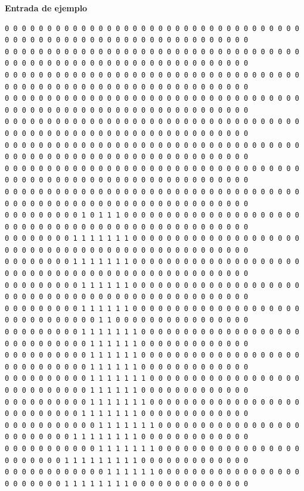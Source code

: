 \documentclass{oci}
\begin{document}
\newpage
\begin{sampleDescription}
{\bf Entrada de ejemplo}
{\tiny
\begin{verbatim}
0 0 0 0 0 0 0 0 0 0 0 0 0 0 0 0 0 0 0 0 0 0 0 0 0 0 0 0 0 0 0 0 0 0 0 0 0 0 0 0 0 0 0 0 0 0 0 0 0 0 0 0 0 0 0 0 0 0 0 0 0 0 0 0
0 0 0 0 0 0 0 0 0 0 0 0 0 0 0 0 0 0 0 0 0 0 0 0 0 0 0 0 0 0 0 0 0 0 0 0 0 0 0 0 0 0 0 0 0 0 0 0 0 0 0 0 0 0 0 0 0 0 0 0 0 0 0 0
0 0 0 0 0 0 0 0 0 0 0 0 0 0 0 0 0 0 0 0 0 0 0 0 0 0 0 0 0 0 0 0 0 0 0 0 0 0 0 0 0 0 0 0 0 0 0 0 0 0 0 0 0 0 0 0 0 0 0 0 0 0 0 0
0 0 0 0 0 0 0 0 0 0 0 0 0 0 0 0 0 0 0 0 0 0 0 0 0 0 0 0 0 0 0 0 0 0 0 0 0 0 0 0 0 0 0 0 0 0 0 0 0 0 0 0 0 0 0 0 0 0 0 0 0 0 0 0
0 0 0 0 0 0 0 0 0 0 0 0 0 0 0 0 0 0 0 0 0 0 0 0 0 0 0 0 0 0 0 0 0 0 0 0 0 0 0 0 0 0 0 0 0 0 0 0 0 0 0 0 0 0 0 0 0 0 0 0 0 0 0 0
0 0 0 0 0 0 0 0 0 0 0 0 0 0 0 0 0 0 0 0 0 0 0 0 0 0 0 0 0 0 0 0 0 0 0 0 0 0 0 0 0 0 0 0 0 0 0 0 0 0 0 0 0 0 0 0 0 0 0 0 0 0 0 0
0 0 0 0 0 0 0 0 0 0 0 0 0 0 0 0 0 0 0 0 0 0 0 0 0 0 0 0 0 0 0 0 0 0 0 0 0 0 0 0 0 0 0 0 0 0 0 0 0 0 0 0 0 0 0 0 0 0 0 0 0 0 0 0
0 0 0 0 0 0 0 0 0 0 0 0 0 0 0 0 0 0 0 0 0 0 0 0 0 0 0 0 0 0 0 0 0 0 0 0 0 0 0 0 0 0 0 0 0 0 0 0 0 0 0 0 0 0 0 0 0 0 0 0 0 0 0 0
0 0 0 0 0 0 0 0 0 1 0 1 1 1 0 0 0 0 0 0 0 0 0 0 0 0 0 0 0 0 0 0 0 0 0 0 0 0 0 0 0 0 0 0 0 0 0 0 0 0 0 0 0 0 0 0 0 0 0 0 0 0 0 0
0 0 0 0 0 0 0 0 1 1 1 1 1 1 1 0 0 0 0 0 0 0 0 0 0 0 0 0 0 0 0 0 0 0 0 0 0 0 0 0 0 0 0 0 0 0 0 0 0 0 0 0 0 0 0 0 0 0 0 0 0 0 0 0
0 0 0 0 0 0 0 0 1 1 1 1 1 1 1 0 0 0 0 0 0 0 0 0 0 0 0 0 0 0 0 0 0 0 0 0 0 0 0 0 0 0 0 0 0 0 0 0 0 0 0 0 0 0 0 0 0 0 0 0 0 0 0 0
0 0 0 0 0 0 0 0 0 1 1 1 1 1 1 0 0 0 0 0 0 0 0 0 0 0 0 0 0 0 0 0 0 0 0 0 0 0 0 0 0 0 0 0 0 0 0 0 0 0 0 0 0 0 0 0 0 0 0 0 0 0 0 0
0 0 0 0 0 0 0 0 0 1 1 1 1 1 1 0 0 0 0 0 0 0 0 0 0 0 0 0 0 0 0 0 0 0 0 0 0 0 0 0 0 0 0 0 0 0 1 1 0 0 0 0 0 0 0 0 0 0 0 0 0 0 0 0
0 0 0 0 0 0 0 0 0 1 1 1 1 1 1 1 0 0 0 0 0 0 0 0 0 0 0 0 0 0 0 0 0 0 0 0 0 0 0 0 0 0 0 0 0 1 1 1 1 1 1 0 0 0 0 0 0 0 0 0 0 0 0 0
0 0 0 0 0 0 0 0 0 0 1 1 1 1 1 1 0 0 0 0 0 0 0 0 0 0 0 0 0 0 0 0 0 0 0 0 0 0 0 0 0 0 0 0 0 1 1 1 1 1 1 0 0 0 0 0 0 0 0 0 0 0 0 0
0 0 0 0 0 0 0 0 0 0 1 1 1 1 1 1 1 0 0 0 0 0 0 0 0 0 0 0 0 0 0 0 0 0 0 0 0 0 0 0 0 0 0 0 0 1 1 1 1 1 1 0 0 0 0 0 0 0 0 0 0 0 0 0
0 0 0 0 0 0 0 0 0 0 1 1 1 1 1 1 1 0 0 0 0 0 0 0 0 0 0 0 0 0 0 0 0 0 0 0 0 0 0 0 0 0 0 0 1 1 1 1 1 1 1 0 0 0 0 0 0 0 0 0 0 0 0 0
0 0 0 0 0 0 0 0 0 0 0 1 1 1 1 1 1 1 0 0 0 0 0 0 0 0 0 0 0 0 0 0 0 0 0 0 0 0 0 0 0 0 0 1 1 1 1 1 1 1 1 0 0 0 0 0 0 0 0 0 0 0 0 0
0 0 0 0 0 0 0 0 0 0 0 1 1 1 1 1 1 1 0 0 0 0 0 0 0 0 0 0 0 0 0 0 0 0 0 0 0 0 0 0 0 0 1 1 1 1 1 1 1 1 1 0 0 0 0 0 0 0 0 0 0 0 0 0
0 0 0 0 0 0 0 0 0 0 0 0 1 1 1 1 1 1 0 0 0 0 0 0 0 0 0 0 0 0 0 0 0 0 0 0 0 0 0 0 0 0 1 1 1 1 1 1 1 1 0 0 0 0 0 0 0 0 0 0 0 0 0 0

\end{verbatim}}
\end{sampleDescription}
\end{document}
